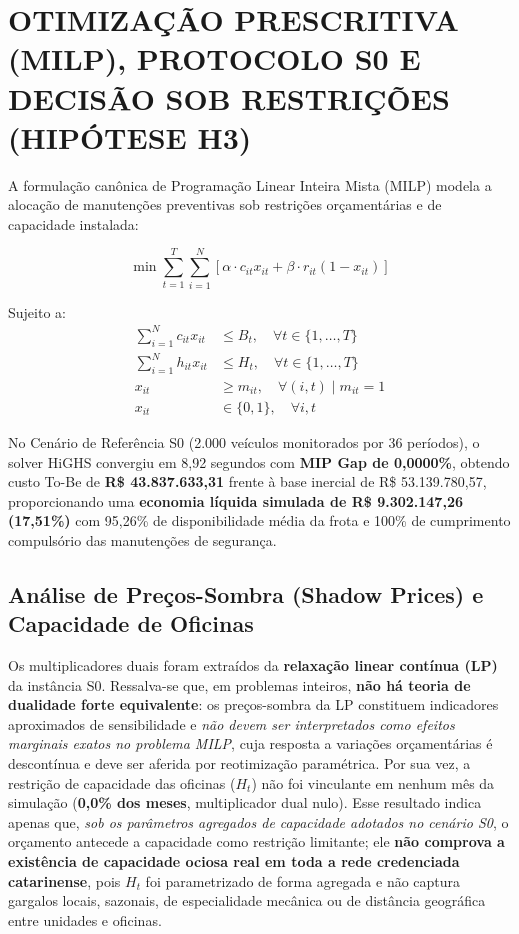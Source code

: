\chapter{OTIMIZAÇÃO PRESCRITIVA (MILP), PROTOCOLO S0 E DECISÃO SOB RESTRIÇÕES (HIPÓTESE H3)}
\label{cap:milp}

A formulação canônica de Programação Linear Inteira Mista (MILP) modela a alocação de manutenções preventivas sob restrições orçamentárias e de capacidade instalada:

\begin{equation}
    \min \sum_{t=1}^{T} \sum_{i=1}^{N} \left[ \alpha \cdot c_{it} x_{it} + \beta \cdot r_{it} (1 - x_{it}) \right]
\end{equation}

\noindent Sujeito a:
\begin{align}
    \sum_{i=1}^{N} c_{it} x_{it} &\le B_t, \quad \forall t \in \{1, \dots, T\} \\
    \sum_{i=1}^{N} h_{it} x_{it} &\le H_t, \quad \forall t \in \{1, \dots, T\} \\
    x_{it} &\ge m_{it}, \quad \forall (i, t) \mid m_{it} = 1 \\
    x_{it} &\in \{0, 1\}, \quad \forall i, t
\end{align}

No Cenário de Referência S0 (2.000 veículos monitorados por 36 períodos), o solver HiGHS convergiu em 8,92 segundos com \textbf{MIP Gap de 0,0000\%}, obtendo custo To-Be de \textbf{R\$ 43.837.633,31} frente à base inercial de R\$ 53.139.780,57, proporcionando uma \textbf{economia líquida simulada de R\$ 9.302.147,26 (17,51\%)} com 95,26\% de disponibilidade média da frota e 100\% de cumprimento compulsório das manutenções de segurança.

\section{Análise de Preços-Sombra (Shadow Prices) e Capacidade de Oficinas}

Os multiplicadores duais foram extraídos da \textbf{relaxação linear contínua (LP)} da instância S0. Ressalva-se que, em problemas inteiros, \textbf{não há teoria de dualidade forte equivalente}: os preços-sombra da LP constituem indicadores aproximados de sensibilidade e \textit{não devem ser interpretados como efeitos marginais exatos no problema MILP}, cuja resposta a variações orçamentárias é descontínua e deve ser aferida por reotimização paramétrica. Por sua vez, a restrição de capacidade das oficinas ($H_t$) não foi vinculante em nenhum mês da simulação (\textbf{0,0\% dos meses}, multiplicador dual nulo). Esse resultado indica apenas que, \textit{sob os parâmetros agregados de capacidade adotados no cenário S0}, o orçamento antecede a capacidade como restrição limitante; ele \textbf{não comprova a existência de capacidade ociosa real em toda a rede credenciada catarinense}, pois $H_t$ foi parametrizado de forma agregada e não captura gargalos locais, sazonais, de especialidade mecânica ou de distância geográfica entre unidades e oficinas.
